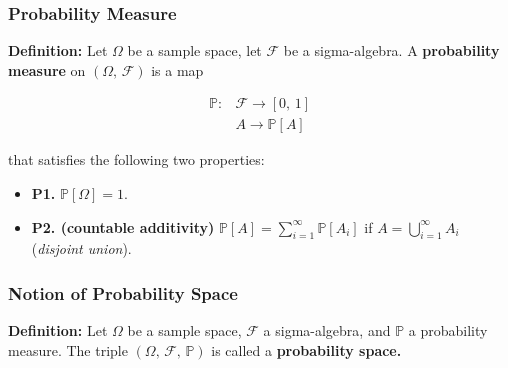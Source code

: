 \documentclass[a4paper]{extarticle}
\begin{document}
\subsubsection{Probability Measure}

\textbf{Definition:} Let \(\Omega\) be a sample space, let \(\mathcal{F}\) be a sigma-algebra. A \textbf{probability measure} on \((\Omega, \, \mathcal{F})\) is a map

\begin{align*}
    \mathbb{P} : &\mathcal{F} \to [0, \, 1] \\
    &A \to \mathbb{P}[A]
\end{align*}

that satisfies the following two properties:

\begin{itemize}
    \item \textbf{P1.} \(\mathbb{P}[\Omega] = 1\).
    \item \textbf{P2. (countable additivity)} \(\mathbb{P}[A] = \sum_{i = 1}^{\infty} \mathbb{P}[A_i]\) if \(A = \bigcup_{i = 1}^{\infty} A_i\) (\textit{disjoint union}).
\end{itemize}

\subsubsection{Notion of Probability Space}

\textbf{Definition:} Let \(\Omega\) be a sample space, \(\mathcal{F}\) a sigma-algebra, and \(\mathbb{P}\) a probability measure. The triple \((\Omega, \, \mathcal{F}, \, \mathbb{P})\) is called a \textbf{probability space.}
\end{document}
